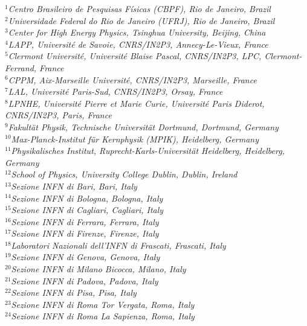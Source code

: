 \documentclass[12pt,a4paper]{article}
\begin{document}
\begin{flushleft}
{\footnotesize \it
$ ^{1}$Centro Brasileiro de Pesquisas F\'{i}sicas (CBPF), Rio de Janeiro, Brazil\\
$ ^{2}$Universidade Federal do Rio de Janeiro (UFRJ), Rio de Janeiro, Brazil\\
$ ^{3}$Center for High Energy Physics, Tsinghua University, Beijing, China\\
$ ^{4}$LAPP, Universit\'{e} de Savoie, CNRS/IN2P3, Annecy-Le-Vieux, France\\
$ ^{5}$Clermont Universit\'{e}, Universit\'{e} Blaise Pascal, CNRS/IN2P3, LPC, Clermont-Ferrand, France\\
$ ^{6}$CPPM, Aix-Marseille Universit\'{e}, CNRS/IN2P3, Marseille, France\\
$ ^{7}$LAL, Universit\'{e} Paris-Sud, CNRS/IN2P3, Orsay, France\\
$ ^{8}$LPNHE, Universit\'{e} Pierre et Marie Curie, Universit\'{e} Paris Diderot, CNRS/IN2P3, Paris, France\\
$ ^{9}$Fakult\"{a}t Physik, Technische Universit\"{a}t Dortmund, Dortmund, Germany\\
$ ^{10}$Max-Planck-Institut f\"{u}r Kernphysik (MPIK), Heidelberg, Germany\\
$ ^{11}$Physikalisches Institut, Ruprecht-Karls-Universit\"{a}t Heidelberg, Heidelberg, Germany\\
$ ^{12}$School of Physics, University College Dublin, Dublin, Ireland\\
$ ^{13}$Sezione INFN di Bari, Bari, Italy\\
$ ^{14}$Sezione INFN di Bologna, Bologna, Italy\\
$ ^{15}$Sezione INFN di Cagliari, Cagliari, Italy\\
$ ^{16}$Sezione INFN di Ferrara, Ferrara, Italy\\
$ ^{17}$Sezione INFN di Firenze, Firenze, Italy\\
$ ^{18}$Laboratori Nazionali dell'INFN di Frascati, Frascati, Italy\\
$ ^{19}$Sezione INFN di Genova, Genova, Italy\\
$ ^{20}$Sezione INFN di Milano Bicocca, Milano, Italy\\
$ ^{21}$Sezione INFN di Padova, Padova, Italy\\
$ ^{22}$Sezione INFN di Pisa, Pisa, Italy\\
$ ^{23}$Sezione INFN di Roma Tor Vergata, Roma, Italy\\
$ ^{24}$Sezione INFN di Roma La Sapienza, Roma, Italy\\
}
\end{flushleft}
\end{document}
